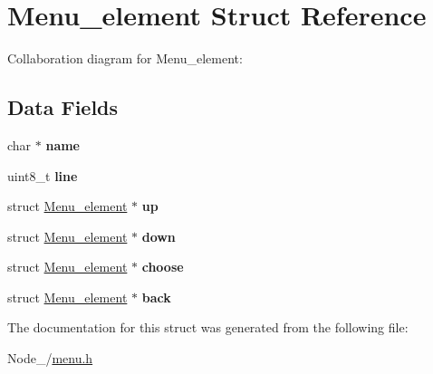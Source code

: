 \hypertarget{structMenu__element}{}\section{Menu\+\_\+element Struct Reference}
\label{structMenu__element}


Collaboration diagram for Menu\+\_\+element\+:
\subsection*{Data Fields}
\begin{DoxyCompactItemize}
\item 
char $\ast$ {\bfseries name}\hypertarget{structMenu__element_af24485dffe6ed1349103e8112998aa17}{}\label{structMenu__element_af24485dffe6ed1349103e8112998aa17}

\item 
uint8\+\_\+t {\bfseries line}\hypertarget{structMenu__element_aa760a9e8689a88dcdef1f90217ff2d3b}{}\label{structMenu__element_aa760a9e8689a88dcdef1f90217ff2d3b}

\item 
struct \hyperlink{structMenu__element}{Menu\+\_\+element} $\ast$ {\bfseries up}\hypertarget{structMenu__element_a48b3f439d482e828af9a2512015abc04}{}\label{structMenu__element_a48b3f439d482e828af9a2512015abc04}

\item 
struct \hyperlink{structMenu__element}{Menu\+\_\+element} $\ast$ {\bfseries down}\hypertarget{structMenu__element_a424ffdbd202253365fca9764a3f9a314}{}\label{structMenu__element_a424ffdbd202253365fca9764a3f9a314}

\item 
struct \hyperlink{structMenu__element}{Menu\+\_\+element} $\ast$ {\bfseries choose}\hypertarget{structMenu__element_a8fad5310563893b919bf01a77619ecac}{}\label{structMenu__element_a8fad5310563893b919bf01a77619ecac}

\item 
struct \hyperlink{structMenu__element}{Menu\+\_\+element} $\ast$ {\bfseries back}\hypertarget{structMenu__element_a24546cbfe6d833a7fdf3b6f11bbd9871}{}\label{structMenu__element_a24546cbfe6d833a7fdf3b6f11bbd9871}

\end{DoxyCompactItemize}


The documentation for this struct was generated from the following file\+:\begin{DoxyCompactItemize}
\item 
Node\+\_/\hyperlink{menu_8h}{menu.\+h}\end{DoxyCompactItemize}
